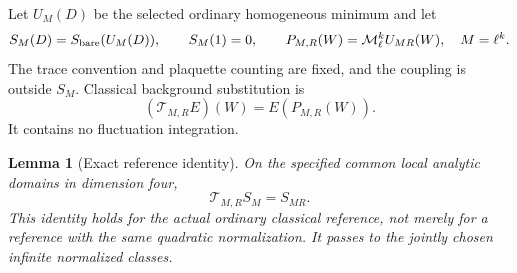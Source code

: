\documentclass[11pt]{article}
\newtheorem{lemma}[theorem]{Lemma}
\theoremstyle{remark}
\begin{document}
Let $U_M(D)$ be the selected ordinary homogeneous minimum and let
\begin{equation}
 S_M(D)=S_{\rm bare}(U_M(D)),\qquad S_M(1)=0,
 \qquad
 P_{M,R}(W)=\mathcal M_\ell^k U_{MR}(W),\quad M=\ell^k.
 \label{eqr-reference-definition}
\end{equation}
The trace convention and plaquette counting are fixed, and the coupling
is outside $S_M$. Classical background substitution is
\[
        (\mathcal T_{M,R}E)(W)=E(P_{M,R}(W)).
\]
It contains no fluctuation integration.

\begin{lemma}[Exact reference identity]
\label{eqr-reference-lemma}
On the specified common local analytic domains in dimension four,
\begin{equation}
                  \mathcal T_{M,R}S_M=S_{MR}.
 \label{eqr-reference-transport}
\end{equation}
This identity holds for the actual ordinary classical reference,
not merely for a reference with the same quadratic normalization.
It passes to the jointly chosen infinite normalized classes.
\end{lemma}
\end{document}
